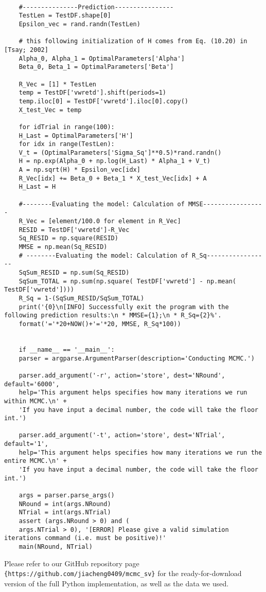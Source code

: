 \documentclass[letterpaper]{article}
\begin{document}
\begin{lstlisting}[label=lst:pythoncode]
	
	#---------------Prediction----------------
	TestLen = TestDF.shape[0]
	Epsilon_vec = rand.randn(TestLen)
	
	# this following initialization of H comes from Eq. (10.20) in [Tsay; 2002]
	Alpha_0, Alpha_1 = OptimalParameters['Alpha']
	Beta_0, Beta_1 = OptimalParameters['Beta']
	
	R_Vec = [1] * TestLen
	temp = TestDF['vwretd'].shift(periods=1)
	temp.iloc[0] = TestDF['vwretd'].iloc[0].copy()
	X_test_Vec = temp
	
	for idTrial in range(100):
	H_Last = OptimalParameters['H']
	for idx in range(TestLen):
	V_t = (OptimalParameters['Sigma_Sq']**0.5)*rand.randn()
	H = np.exp(Alpha_0 + np.log(H_Last) * Alpha_1 + V_t)
	A = np.sqrt(H) * Epsilon_vec[idx]
	R_Vec[idx] += Beta_0 + Beta_1 * X_test_Vec[idx] + A
	H_Last = H
	
	#--------Evaluating the model: Calculation of MMSE-----------------
	R_Vec = [element/100.0 for element in R_Vec]
	RESID = TestDF['vwretd']-R_Vec
	Sq_RESID = np.square(RESID)
	MMSE = np.mean(Sq_RESID)
	# --------Evaluating the model: Calculation of R_Sq-----------------
	SqSum_RESID = np.sum(Sq_RESID)
	SqSum_TOTAL = np.sum(np.square( TestDF['vwretd'] - np.mean( TestDF['vwretd'])))
	R_Sq = 1-(SqSum_RESID/SqSum_TOTAL)
	print('{0}\n[INFO] Successfully exit the program with the following prediction results:\n * MMSE={1};\n * R_Sq={2}%'.
	format('='*20+NOW()+'='*20, MMSE, R_Sq*100))
	
	
	if __name__ == '__main__':
	parser = argparse.ArgumentParser(description='Conducting MCMC.')
	
	parser.add_argument('-r', action='store', dest='NRound', default='6000',
	help='This argument helps specifies how many iterations we run within MCMC.\n' +
	'If you have input a decimal number, the code will take the floor int.')
	
	parser.add_argument('-t', action='store', dest='NTrial', default='1',
	help='This argument helps specifies how many iterations we run the entire MCMC.\n' +
	'If you have input a decimal number, the code will take the floor int.')
	
	args = parser.parse_args()
	NRound = int(args.NRound)
	NTrial = int(args.NTrial)
	assert (args.NRound > 0) and (
	args.NTrial > 0), '[ERROR] Please give a valid simulation iterations command (i.e. must be positive)!'
	main(NRound, NTrial)
	\end{lstlisting}
	Please refer to our GitHub repository page \verb!{https://github.com/jiacheng0409/mcmc_sv}! for the ready-for-download version of the full Python implementation, as well as the data we used.
	
	
	\newpage
	
	
	
	
\end{document}
